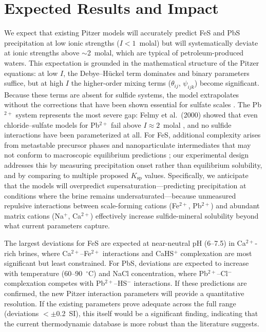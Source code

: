 \documentclass[12pt]{article}
\begin{document}
\section{Expected Results and Impact}

We expect that existing Pitzer models will accurately predict FeS and PbS precipitation at low ionic strengths ($I < 1$~molal) but will systematically deviate at ionic strengths above $\sim$2~molal, which are typical of petroleum-produced waters. This expectation is grounded in the mathematical structure of the Pitzer equations: at low $I$, the Debye--H\"uckel term dominates and binary parameters suffice, but at high $I$ the higher-order mixing terms ($\theta_{ij}$, $\psi_{ijk}$) become significant. Because these terms are absent for sulfide systems, the model extrapolates without the corrections that have been shown essential for sulfate scales \cite{kan2019}. The Pb$^{2+}$ system represents the most severe gap: Felmy et al.\ (2000) showed that even chloride--sulfate models for Pb$^{2+}$ fail above $I \approx 2$~molal \cite{felmy2000}, and no sulfide interactions have been parameterized at all. For FeS, additional complexity arises from metastable precursor phases and nanoparticulate intermediates that may not conform to macroscopic equilibrium predictions \cite{kan2019}; our experimental design addresses this by measuring precipitation onset rather than equilibrium solubility, and by comparing to multiple proposed $K_{\text{sp}}$ values. Specifically, we anticipate that the models will overpredict supersaturation---predicting precipitation at conditions where the brine remains undersaturated---because unmeasured repulsive interactions between scale-forming cations (Fe$^{2+}$, Pb$^{2+}$) and abundant matrix cations (Na$^+$, Ca$^{2+}$) effectively increase sulfide-mineral solubility beyond what current parameters capture.

The largest deviations for FeS are expected at near-neutral pH (6--7.5) in Ca$^{2+}$-rich brines, where Ca$^{2+}$--Fe$^{2+}$ interactions and CaHS$^+$ complexation are most significant but least constrained. For PbS, deviations are expected to increase with temperature (60--90~$^\circ$C) and NaCl concentration, where Pb$^{2+}$--Cl$^-$ complexation competes with Pb$^{2+}$--HS$^-$ interactions. If these predictions are confirmed, the new Pitzer interaction parameters will provide a quantitative resolution. If the existing parameters prove adequate across the full range (deviations $< \pm$0.2~SI), this itself would be a significant finding, indicating that the current thermodynamic database is more robust than the literature suggests.
\end{document}

